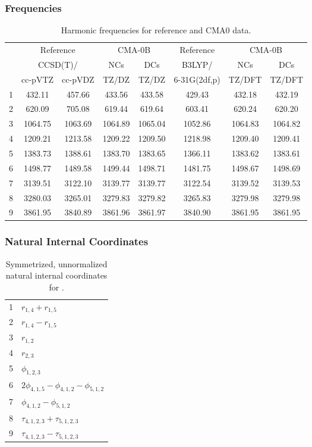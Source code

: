 \documentclass[10pt,oneside]{article}
\begin{document}
\subsubsection*{Frequencies}
\begin{table}[h!]
\centering
\caption{Harmonic frequencies for reference and CMA0 data.}
\begin{tabular}{cccccccc}
\toprule
{} & \multicolumn{2}{c}{Reference} & \multicolumn{2}{c}{CMA-0B} &    Reference & \multicolumn{2}{c}{CMA-0B} \\
{} & \multicolumn{2}{c}{CCSD(T)/} &     NCs &     DCs &       B3LYP/ &     NCs &     DCs \\
{} &   cc-pVTZ & cc-pVDZ &   TZ/DZ &   TZ/DZ & 6-31G(2df,p) &  TZ/DFT &  TZ/DFT \\
\midrule
1 &    432.11 &  457.66 &  433.56 &  433.58 &       429.43 &  432.18 &  432.19 \\
2 &    620.09 &  705.08 &  619.44 &  619.64 &       603.41 &  620.24 &  620.20 \\
3 &   1064.75 & 1063.69 & 1064.89 & 1065.04 &      1052.86 & 1064.83 & 1064.82 \\
4 &   1209.21 & 1213.58 & 1209.22 & 1209.50 &      1218.98 & 1209.40 & 1209.41 \\
5 &   1383.73 & 1388.61 & 1383.70 & 1383.65 &      1366.11 & 1383.62 & 1383.61 \\
6 &   1498.77 & 1489.58 & 1499.44 & 1498.71 &      1481.75 & 1498.67 & 1498.69 \\
7 &   3139.51 & 3122.10 & 3139.77 & 3139.77 &      3122.54 & 3139.52 & 3139.53 \\
8 &   3280.03 & 3265.01 & 3279.83 & 3279.82 &      3265.83 & 3279.98 & 3279.98 \\
9 &   3861.95 & 3840.89 & 3861.96 & 3861.97 &      3840.90 & 3861.95 & 3861.95 \\
\bottomrule
\end{tabular}
\end{table}

\clearpage

\subsubsection*{Natural Internal Coordinates}
\begin{table}[h!]
\centering
\caption{Symmetrized, unnormalized natural internal coordinates for .}
\small
\begin{tabular}{ll}
  1   & $r_{1,4} + r_{1,5}$ \\
  2   & $r_{1,4} - r_{1,5}$ \\
  3   & $r_{1,2}$ \\
  4   & $r_{2,3}$ \\
  5   & $\phi_{1,2,3}$ \\
  6   & $2\phi_{4,1,5} - \phi_{4,1,2} - \phi_{5,1,2}$ \\
  7   & $\phi_{4,1,2} - \phi_{5,1,2}$ \\
  8   & $\tau_{4,1,2,3} + \tau_{5,1,2,3}$ \\
  9   & $\tau_{4,1,2,3} - \tau_{5,1,2,3}$ \\
\end{tabular}
\end{table}
\end{document}
